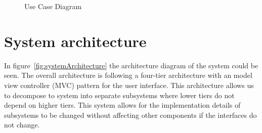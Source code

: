 \begin{figure}
	\caption{Use Case Diagram}
\label{fig:useCase}
\end{figure}

\FloatBarrier
\section{System architecture}
In figure~\ref{fig:systemArchitecture} the architecture diagram of the system could be seen. The overall architecture is following a four-tier architecture with an model view controller (MVC) pattern for the user interface. This architecture allows us to decompose to system into separate subsystems where lower tiers do not depend on higher tiers. This system allows for the implementation details of subsystems to be changed without affecting other components if the interfaces do not change.

